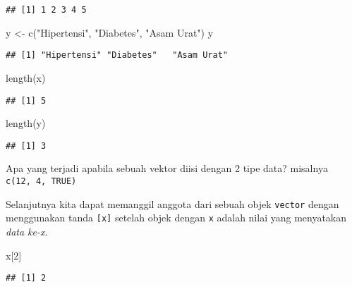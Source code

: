 \documentclass[
]{book}
\newenvironment{Shaded}{\begin{snugshade}}{\end{snugshade}}
\newcommand{\DecValTok}[1]{\textcolor[rgb]{0.00,0.00,0.81}{#1}}
\newcommand{\FunctionTok}[1]{\textcolor[rgb]{0.00,0.00,0.00}{#1}}
\newcommand{\NormalTok}[1]{#1}
\newcommand{\OtherTok}[1]{\textcolor[rgb]{0.56,0.35,0.01}{#1}}
\newcommand{\StringTok}[1]{\textcolor[rgb]{0.31,0.60,0.02}{#1}}
\begin{document}
\begin{verbatim}
## [1] 1 2 3 4 5
\end{verbatim}

\begin{Shaded}
\begin{Highlighting}[]
\NormalTok{y }\OtherTok{\textless{}{-}} \FunctionTok{c}\NormalTok{(}\StringTok{"Hipertensi"}\NormalTok{, }\StringTok{"Diabetes"}\NormalTok{, }\StringTok{"Asam Urat"}\NormalTok{)}
\NormalTok{y}
\end{Highlighting}
\end{Shaded}

\begin{verbatim}
## [1] "Hipertensi" "Diabetes"   "Asam Urat"
\end{verbatim}

\begin{Shaded}
\begin{Highlighting}[]
\FunctionTok{length}\NormalTok{(x)}
\end{Highlighting}
\end{Shaded}

\begin{verbatim}
## [1] 5
\end{verbatim}

\begin{Shaded}
\begin{Highlighting}[]
\FunctionTok{length}\NormalTok{(y)}
\end{Highlighting}
\end{Shaded}

\begin{verbatim}
## [1] 3
\end{verbatim}

Apa yang terjadi apabila sebuah vektor diisi dengan 2 tipe data? misalnya \texttt{c(12,\ 4,\ TRUE)}

Selanjutnya kita dapat memanggil anggota dari sebuah objek \texttt{vector} dengan menggunakan tanda \texttt{{[}x{]}} setelah objek dengan \texttt{x} adalah nilai yang menyatakan \emph{data ke-x}.

\begin{Shaded}
\begin{Highlighting}[]
\NormalTok{x[}\DecValTok{2}\NormalTok{]}
\end{Highlighting}
\end{Shaded}

\begin{verbatim}
## [1] 2
\end{verbatim}
\end{document}
